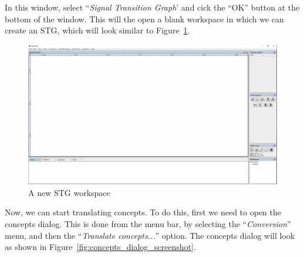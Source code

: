 \documentclass{proc}
\begin{document}
In this window, select ``\emph{Signal Transition Graph}' and cick the ``OK'' button at the bottom of the window. This will the open a blank workspace in which we can create an STG, which 
will look similar to Figure~\ref{fig:blank_stg_work}.

\begin{figure}[H]
\begin{centering}
\includegraphics[scale=0.2]{images/new_stg_screenshot}
\par\end{centering}

\begin{centering}
\protect\caption{\label{fig:blank_stg_work}A new STG workspace}

\par\end{centering}

\end{figure}

Now, we can start translating concepts. To do this, first we need to open the concepts dialog.  This is done from the menu bar, by selecting the ``\emph{Conversion}'' menu, and then the 
``\emph{Translate concepts...}'' option. The concepts dialog will look as shown in Figure~\ref{fig:concepts_dialog_screenshot}.
\end{document}
